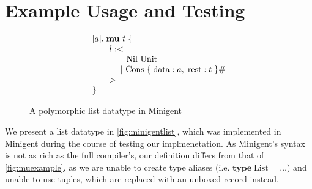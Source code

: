 \section{Example Usage and Testing}
\label{ch:examplesandtesting}

\begin{figure}
    \centering
    \[
        \begin{array}{l}
            [a].\; \textbf{mu}\ t\; \{ \\
            \hspace{2em} l: < \\
            \hspace{4em}    \text{Nil Unit} \\
            \hspace{3.3em}  |\ \text{Cons}\; \{\; \text{data}: a,\; \text{rest}: t\; \}\# \\ 
            \hspace{2em} > \\
            \}
        \end{array}    
    \]
    \caption{A polymorphic list datatype in Minigent}
    \label{fig:minigentlist}
\end{figure}

We present a list datatype in \autoref{fig:minigentlist}, which was implemented in Minigent during the course
of testing our implmenetation. As Minigent's syntax is not as rich as the full compiler's,
our definition differs from that of \autoref{fig:muexample}, as we are unable to create
type aliases (i.e. $\textbf{type}\; \text{List} = \dots$) and unable to use tuples,
which are replaced with an unboxed record instead.

